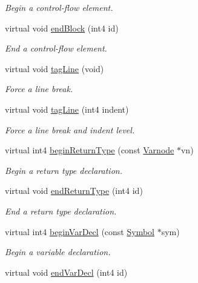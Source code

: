 \begin{DoxyCompactItemize}
\begin{DoxyCompactList}\small\item\em Begin a control-\/flow element. \end{DoxyCompactList}\item 
virtual void \mbox{\hyperlink{class_emit_xml_a935b2c6ff63356ee30fa050c2b301bde}{end\+Block}} (int4 id)
\begin{DoxyCompactList}\small\item\em End a control-\/flow element. \end{DoxyCompactList}\item 
virtual void \mbox{\hyperlink{class_emit_xml_a2c98eede26b667575347382df89ab310}{tag\+Line}} (void)
\begin{DoxyCompactList}\small\item\em Force a line break. \end{DoxyCompactList}\item 
virtual void \mbox{\hyperlink{class_emit_xml_afb2b27a85e75136cf66d143d2dd502ae}{tag\+Line}} (int4 indent)
\begin{DoxyCompactList}\small\item\em Force a line break and indent level. \end{DoxyCompactList}\item 
virtual int4 \mbox{\hyperlink{class_emit_xml_ac0216ea06080892db047c720a38ba304}{begin\+Return\+Type}} (const \mbox{\hyperlink{class_varnode}{Varnode}} $\ast$vn)
\begin{DoxyCompactList}\small\item\em Begin a return type declaration. \end{DoxyCompactList}\item 
virtual void \mbox{\hyperlink{class_emit_xml_af7f778b3b2111e793d6ffd73017209f9}{end\+Return\+Type}} (int4 id)
\begin{DoxyCompactList}\small\item\em End a return type declaration. \end{DoxyCompactList}\item 
virtual int4 \mbox{\hyperlink{class_emit_xml_a039212bc4a27cf56f1c70acd4d4623b6}{begin\+Var\+Decl}} (const \mbox{\hyperlink{class_symbol}{Symbol}} $\ast$sym)
\begin{DoxyCompactList}\small\item\em Begin a variable declaration. \end{DoxyCompactList}\item 
virtual void \mbox{\hyperlink{class_emit_xml_a8700bdf9d4e073ae392ef722f53ceb45}{end\+Var\+Decl}} (int4 id)

\end{DoxyCompactItemize}
